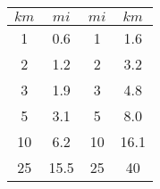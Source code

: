 \documentclass{article}
\begin{document}
\begin{multicols}{2}
\begin{multicols}{2}
\columnbreak

\begin{tabular}{cc|cc}
	$km$ & $mi$ & $mi$ & $km$ \\ \hline
	1			&	0.6		& 1		& 1.6 	\\
	2			&	1.2		& 2		& 3.2 	\\
	3			& 	1.9		& 3		& 4.8 	\\
	5			&	3.1		& 5		& 8.0 	\\
	10			&	6.2		& 10	& 16.1 	\\
	25			&	15.5	& 25	& 40 	\\
\end{tabular}



\end{multicols}

\end{multicols}
\end{document}
